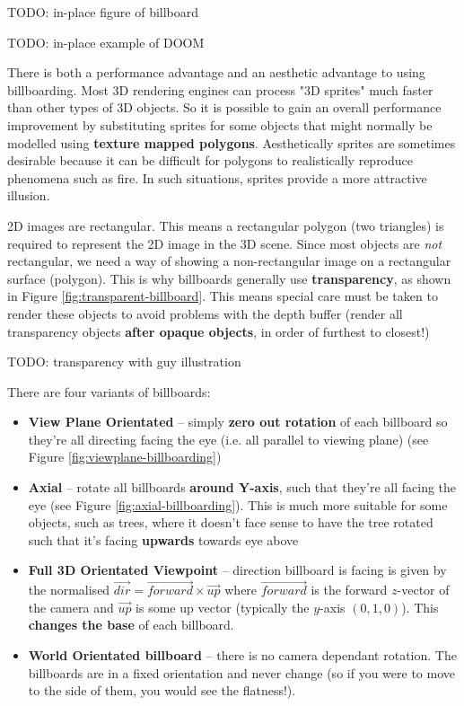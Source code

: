 \documentclass{article}
\begin{document}
TODO: in-place figure of billboard

TODO: in-place example of DOOM

There is both a performance advantage and an aesthetic advantage to using billboarding. Most 3D rendering engines can process "3D sprites" much faster than other types of 3D objects. So it is possible to gain an overall performance improvement by substituting sprites for some objects that might normally be modelled using \textbf{texture mapped polygons}. Aesthetically sprites are sometimes desirable because it can be difficult for polygons to realistically reproduce phenomena such as fire. In such situations, sprites provide a more attractive illusion.

2D images are rectangular. This means a rectangular polygon (two triangles) is required to represent the 2D image in the 3D scene. Since most objects are \textit{not} rectangular, we need a way of showing a non-rectangular image on a rectangular surface (polygon). This is why billboards generally use \textbf{transparency}, as shown in Figure \ref{fig:transparent-billboard}. This means special care must be taken to render these objects to avoid problems with the depth buffer (render all transparency objects \textbf{after opaque objects}, in order of furthest to closest!)

TODO: transparency with guy illustration

There are four variants of billboards:
\begin{itemize}
	\item \textbf{View Plane Orientated} -- simply \textbf{zero out rotation} of each billboard so they're all directing facing the eye (i.e. all parallel to viewing plane) (see Figure \ref{fig:viewplane-billboarding})
	\item \textbf{Axial} -- rotate all billboards \textbf{around Y-axis}, such that they're all facing the eye (see Figure \ref{fig:axial-billboarding}). This is much more suitable for some objects, such as trees, where it doesn't face sense to have the tree rotated such that it's facing \textbf{upwards} towards eye above
	\item \textbf{Full 3D Orientated Viewpoint} -- direction billboard is facing is given by the normalised $\vec{dir} = \vec{forward} \times \vec{up}$ where $\vec{forward}$ is the forward $z$-vector of the camera and $\vec{up}$ is some up vector (typically the $y$-axis $(0, 1, 0)$). This \textbf{changes the base} of each billboard.
	\item \textbf{World Orientated billboard} -- there is no camera dependant rotation. The billboards are in a fixed orientation and never change (so if you were to move to the side of them, you would see the flatness!).
\end{itemize}
\end{document}
